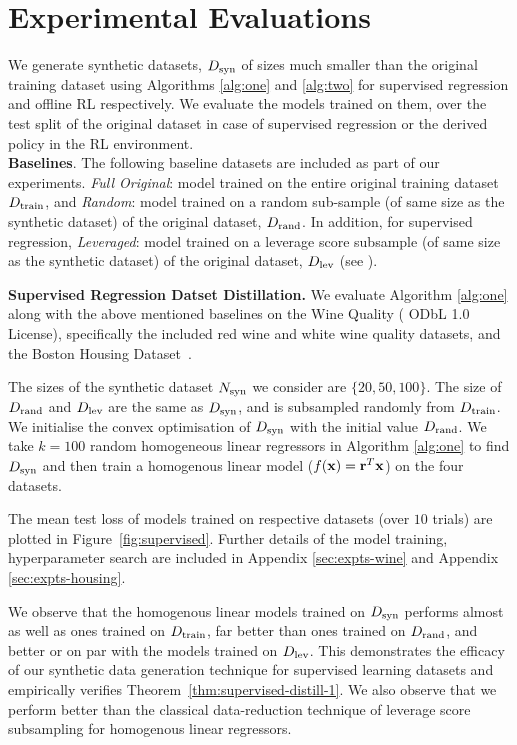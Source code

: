 \section{Experimental Evaluations}\label{sec:expts}

We generate synthetic datasets, $D_{\textnormal{syn}}$ of sizes much smaller than the original training dataset using Algorithms \ref{alg:one} and \ref{alg:two} for supervised regression and offline RL respectively. We evaluate the models trained on them, over the test split of the original dataset in case of supervised regression or the derived policy in the RL environment. \\
\textbf{Baselines}. The following baseline datasets are included as part of our experiments. {\it Full Original}: model trained on the entire original training dataset $D_{\textnormal{train}}$,  and {\it Random}: model trained on a random sub-sample (of same size as the synthetic dataset) of the original dataset, $D_{\textnormal{rand}}$. In addition, for supervised regression, {\it Leveraged}: model trained on a leverage score subsample (of same size as the synthetic dataset) of the original dataset, $D_{\textnormal{lev}}$ (see \cite{drineas2006fast}).




{\bf Supervised Regression Datset Distillation.} We evaluate Algorithm \ref{alg:one} along with the above mentioned baselines on the Wine Quality (\cite{cortez2009modeling} ODbL 1.0 License), 
specifically the included red wine and white wine quality datasets, and the Boston Housing Dataset~\citep{housing}.


The sizes of the synthetic dataset $N_{\textnormal{syn}}$ we consider are $\{20, 50, 100\}$. The size of $D_{\textnormal{rand}}$ and $D_{\textnormal{lev}}$ are the same as $D_{\textnormal{syn}}$, and is subsampled randomly from $D_{\textnormal{train}}$. We initialise the convex optimisation of $D_{\textnormal{syn}}$ with the initial value $D_{\textnormal{rand}}$. We take $k=100$ random homogeneous linear regressors in Algorithm \ref{alg:one} to find $D_{\textnormal{syn}}$ and then train a homogenous linear model ($f({\mathbf{x}}) = {\mathbf{r}}^T{\mathbf{x}}$) on the four datasets. 

The mean test loss of models trained on respective datasets (over $10$ trials) are plotted in Figure~\ref{fig:supervised}. Further details of the model training, hyperparameter search are included in Appendix \ref{sec:expts-wine} and Appendix \ref{sec:expts-housing}.

We observe that the homogenous linear models trained on $D_{\textnormal{syn}}$ performs almost as well as ones trained on $D_{\textnormal{train}}$, far better than ones trained on $D_{\textnormal{rand}}$, and better or on par with the models trained on $D_{\textnormal{lev}}$. This demonstrates the efficacy of our synthetic data generation technique for supervised learning datasets and empirically verifies Theorem~\ref{thm:supervised-distill-1}. We also observe that we perform better than the classical data-reduction technique of leverage score subsampling for homogenous linear regressors.



